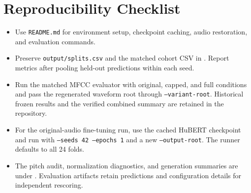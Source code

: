 \documentclass[11pt, letterpaper]{article}
\begin{document}
\section{Reproducibility Checklist}
\begin{itemize}[nosep]
\item Use \texttt{README.md} for environment setup, checkpoint caching, audio restoration, and evaluation commands.
\item Preserve \texttt{output/splits.csv} and the matched cohort CSV in . Report metrics after pooling held-out predictions within each seed.
\item Run the matched MFCC evaluator with original, capped, and full conditions and pass the regenerated waveform root through \texttt{--variant-root}. Historical frozen results and the verified combined summary are retained in the repository.
\item For the original-audio fine-tuning run, use the cached HuBERT checkpoint and run  with \texttt{--seeds 42 --epochs 1} and a new \texttt{--output-root}. The runner defaults to all 24 folds.
\item The pitch audit, normalization diagnostics, and generation summaries are under . Evaluation artifacts retain predictions and configuration details for independent rescoring.
\end{itemize}
\end{document}
